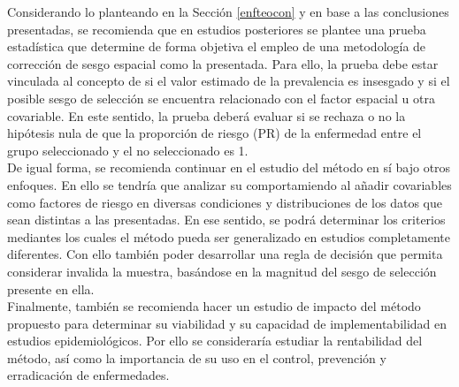 Considerando lo planteando en la Sección \ref{enfteocon} y en base a las conclusiones presentadas, se recomienda que en estudios posteriores se plantee una prueba estadística que determine de forma objetiva el empleo de una metodología de corrección de sesgo espacial como la presentada. Para ello, la prueba debe estar vinculada al concepto de si el valor estimado de la prevalencia es insesgado y si el posible sesgo de selección se encuentra relacionado con el factor espacial u otra covariable. En este sentido, la prueba deberá evaluar si se rechaza o no la hipótesis nula de que la proporción de riesgo (PR) de la enfermedad entre el grupo seleccionado y el no seleccionado es 1.\\
De igual forma, se recomienda continuar en el estudio del método en sí bajo otros enfoques. En ello se tendría que analizar su comportamiendo al añadir covariables como factores de riesgo en diversas condiciones y distribuciones de los datos que sean distintas a las presentadas. En ese sentido, se podrá determinar los criterios mediantes los cuales el método pueda ser generalizado en estudios completamente diferentes. Con ello también poder desarrollar una regla de decisión que permita considerar invalida la muestra, basándose en la magnitud del sesgo de selección presente en ella.\\
Finalmente, también se recomienda hacer un estudio de impacto del método propuesto para determinar su viabilidad y su capacidad de implementabilidad en estudios epidemiológicos. Por ello se consideraría estudiar la rentabilidad del método, así como la importancia de su uso en el control, prevención y erradicación de enfermedades.





